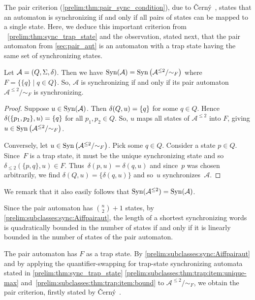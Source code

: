 
The pair criterion (\cref{prelim:thm:pair_sync_condition}), due to \v{C}ern\'y~\cite[Thm.~2]{Cer64},
states that an automaton is synchronizing if and only if all pairs of states can be mapped to a single state.
Here, we deduce this important criterion from \THM~\ref{prelim:thm:sync_trap_state} and the observation, stated next,
that the pair automaton from \cref{sec:pair_aut}
is an automaton with a trap state having the same set of synchronizing states.

\begin{proposition}
	\label{prelim:subclasses:sync:Aiffpairaut}
	Let $\mathcal A = (Q, \Sigma, \delta)$.
	Then we have $\operatorname{Syn}(\mathcal A) = \operatorname{Syn}\left(\mathcal A^{\le 2} / {\sim_F}\right)$ where $F = \{\{q\} \mid q \in Q\}$.
	So, $\mathcal A$ is synchronizing if and only if its pair automaton 
	$\mathcal A^{\le 2} / {\sim_F}$
	is synchronizing.
\end{proposition}
\begin{proof}
	Suppose $u \in \operatorname{Syn}(\mathcal A)$. Then $\delta(Q,u) = \{q\}$ for some $q \in Q$.
	Hence $\delta(\{p_1, p_2\},u) = \{q\}$
    for all $p_1, p_2 \in Q$.
	So, $u$ maps all states of $\mathcal A^{\le 2}$
	into $F$, giving $u \in \operatorname{Syn}\left(\mathcal A^{\le 2} / {\sim_F}\right)$.	
	
	Conversely, let $u \in \operatorname{Syn}\left(\mathcal A^{\le 2} / {\sim_F}\right)$.
	Pick some $q \in Q$.
	Consider a state $p \in Q$.
	Since~$F$ is a trap state, it must be the unique synchronizing state
	and so $\delta_{\le 2}(\{p,q\}, u) \in F$.
	Thus~$\delta(p, u) = \delta(q, u)$
	and since~$p$ was chosen arbitrarily,
	we find $\delta(Q, u) = \{\delta(q, u)\}$
	and so~$u$ synchronizes~$\mathcal A$.
\end{proof}

We remark that it also easily follows that $\operatorname{Syn}(\mathcal A^{\le 2}) = \operatorname{Syn}(\mathcal A)$.

\begin{remark}
 Since the pair automaton has $\binom{n}{2} + 1$ states,
 by \cref{prelim:subclasses:sync:Aiffpairaut},
 the length of a shortest synchronizing words is quadratically bounded
 in the number of states if and only if 
 it is linearly bounded in the number of states of the pair automaton.	
\end{remark}

The pair automaton has $F$ as a trap state. By \cref{prelim:subclasses:sync:Aiffpairaut} and 
by applying the quantifier-swapping for trap-state synchronizing automata stated
in \cref{prelim:thm:sync_trap_state} \ref{prelim:subclasses:thm:trap:item:unique-max} and~\ref{prelim:subclasses:thm:trap:item:bound} 
to $\mathcal A^{\le 2} / {\sim_F}$, we obtain the pair criterion, firstly stated by {\v{C}ern\'y~\cite[Thm.~2]{Cer64}}.

